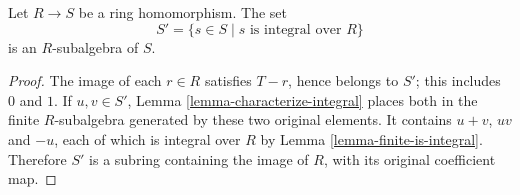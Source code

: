 \begin{lemma}
\label{lemma-integral-closure-is-ring}
Let $R \to S$ be a ring homomorphism.
The set
$$
S' = \{s \in S \mid s\text{ is integral over }R\}
$$
is an $R$-subalgebra of $S$.
\end{lemma}

\begin{proof}
The image of each $r\in R$ satisfies $T-r$, hence belongs to $S'$;
this includes $0$ and $1$. If $u,v\in S'$,
Lemma \ref{lemma-characterize-integral} places both in the finite
$R$-subalgebra generated by these two original elements. It contains
$u+v$, $uv$ and $-u$, each of which is integral over $R$ by
Lemma \ref{lemma-finite-is-integral}. Therefore $S'$ is a subring
containing the image of $R$, with its original coefficient map.
\end{proof}